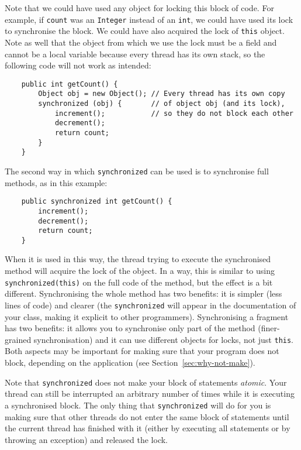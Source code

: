 Note that we could have used any object for locking this block of
code. For example, if \verb+count+ was an \verb+Integer+ instead of an
\verb+int+, we could have used its lock to synchronise the block. We
could have also acquired the lock of \verb+this+ object. Note as well
that the object from which we use the lock must be a field and cannot be a local
variable because every thread has its own stack, so the following code
will not work as intended: 

\begin{verbatim}
    public int getCount() {
        Object obj = new Object(); // Every thread has its own copy 
        synchronized (obj) {       // of object obj (and its lock),
            increment();           // so they do not block each other
            decrement();
            return count;
        }
    }
\end{verbatim}

The second way in which \verb+synchronized+ can be used is to
synchronise full methods, as in this example: 

\begin{verbatim}
    public synchronized int getCount() {
        increment();
        decrement();
        return count;
    }
\end{verbatim}

When it is used in this way, the thread trying to execute the
synchronised method will acquire the lock of the object. In a
way, this is similar to using \verb+synchronized(this)+ on the full
code of the method, but the
effect is a bit different. Synchronising the whole method has two
benefits: it is simpler (less lines of code) and clearer (the
\verb+synchronized+ will appear in the documentation of your class,
making it explicit to other programmers). Synchronising a fragment has
two benefits: it allows you to synchronise only part of the method
(finer-grained synchronisation) 
and it can use different objects for locks, not just \verb+this+. Both
aspects may be important for making sure that your program does
not block, depending on the application (see Section~\ref{sec:why-not-make}). 

Note that \verb+synchronized+ does not make your block of statements
\emph{atomic}. Your thread can still be interrupted an arbitrary
number of times while it is executing a
synchronised block. The only thing that \verb+synchronized+ will do
for you is making sure that other threads do not enter the same block
of statements until the current thread has finished with it (either by
executing all statements or by throwing an exception) and
released the lock. 

